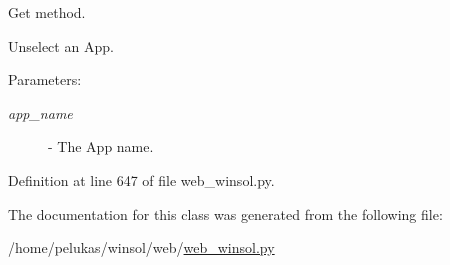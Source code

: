 Get method. 

Unselect an App.

\begin{Desc}
\item[Parameters:]
\begin{description}
\item[{\em app\_\-name}]- The App name. \end{description}
\end{Desc}


Definition at line 647 of file web\_\-winsol.py.

The documentation for this class was generated from the following file:\begin{CompactItemize}
\item 
/home/pelukas/winsol/web/\hyperlink{web__winsol_8py}{web\_\-winsol.py}\end{CompactItemize}
